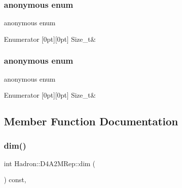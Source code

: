 \subsubsection{\texorpdfstring{anonymous enum}{anonymous enum}}
{\footnotesize\ttfamily anonymous enum}

\begin{DoxyEnumFields}{Enumerator}
[0pt][0pt]{}\mbox{\label{structHadron_1_1D4A2MRep_a93aba48482267e9f91b5a098f34fb6e0a5a7f1ff8353b081fd10503c2bdc27b5a}} 
Size\+\_\+t&\\
\hline

\end{DoxyEnumFields}
\mbox{\label{structHadron_1_1D4A2MRep_a93aba48482267e9f91b5a098f34fb6e0}} 
\subsubsection{\texorpdfstring{anonymous enum}{anonymous enum}}
{\footnotesize\ttfamily anonymous enum}

\begin{DoxyEnumFields}{Enumerator}
[0pt][0pt]{}\mbox{\label{structHadron_1_1D4A2MRep_a93aba48482267e9f91b5a098f34fb6e0a5a7f1ff8353b081fd10503c2bdc27b5a}} 
Size\+\_\+t&\\
\hline

\end{DoxyEnumFields}


\subsection{Member Function Documentation}
\mbox{\label{structHadron_1_1D4A2MRep_a9f511013d556bb6632884f49e20d5c7e}} 
\subsubsection{\texorpdfstring{dim()}{dim()}\hspace{0.1cm}{\footnotesize\ttfamily [1/2]}}
{\footnotesize\ttfamily int Hadron\+::\+D4\+A2\+M\+Rep\+::dim (\begin{DoxyParamCaption}{ }\end{DoxyParamCaption}) const\hspace{0.3cm}{\ttfamily [inline]}, {\ttfamily [virtual]}}

